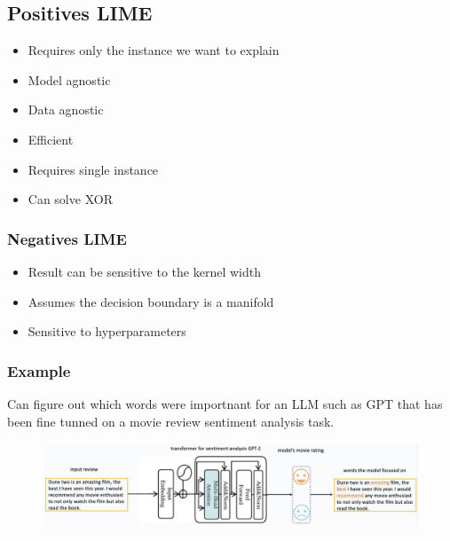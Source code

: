 \subsection{Positives LIME}
\begin{itemize}
    \item Requires only the instance we want to explain 
    \item Model agnostic
    \item Data agnostic
    \item Efficient
    \item Requires single instance
    \item Can solve XOR
\end{itemize}
\subsubsection{Negatives LIME}
\begin{itemize}
    \item Result can be sensitive to the kernel width
    \item Assumes the decision boundary is a manifold
    \item Sensitive to hyperparameters
\end{itemize}

\subsubsection{Example}
Can figure out which words were importnant for an LLM such as GPT that has been fine tunned on a movie review sentiment analysis task.
\begin{figure}[!h]
    \includegraphics[width = \columnwidth]{figures/XAI3/ExampleLIME.png}
\end{figure}